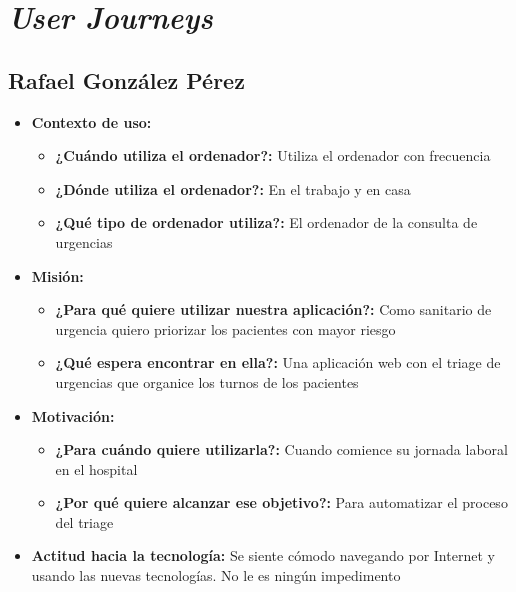 \UseRawInputEncoding
\section{\textit{User Journeys}}\label{anexo}

\subsection{Rafael González Pérez}
\begin{itemize}
    \item \textbf{Contexto de uso: }
    \begin{itemize}
        \item \textbf{¿Cuándo utiliza el ordenador?: }  Utiliza el ordenador con frecuencia
        \item \textbf{¿Dónde utiliza el ordenador?: } En el trabajo y en casa
        \item \textbf{¿Qué tipo de ordenador utiliza?: } El ordenador de la consulta de urgencias
    \end{itemize}
    \item \textbf{Misión: }
    \begin{itemize}
        \item \textbf{¿Para qué quiere utilizar nuestra aplicación?: } Como sanitario de urgencia quiero priorizar los pacientes con mayor riesgo
        \item \textbf{¿Qué espera encontrar en ella?: } Una aplicación web con el triage de urgencias que organice los turnos de los pacientes
    \end{itemize}
    \item \textbf{Motivación: }
    \begin{itemize}
        \item \textbf{¿Para cuándo quiere utilizarla?: } Cuando comience su jornada laboral en el hospital
        \item \textbf{¿Por qué quiere alcanzar ese objetivo?: } Para automatizar el proceso del triage
    \end{itemize}
    \item \textbf{Actitud hacia la tecnología: } Se siente cómodo navegando por Internet y usando las nuevas tecnologías. No le es ningún impedimento
\end{itemize}

